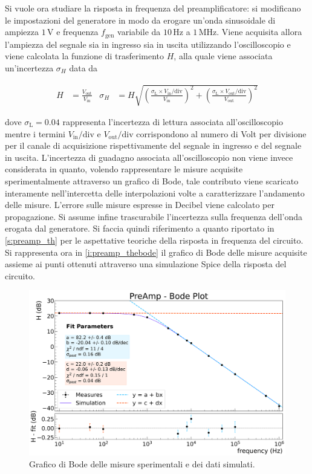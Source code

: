 \documentclass[a4paper,11pt]{article} %
\begin{document}
Si vuole ora studiare la risposta in frequenza del preamplificatore: si modificano le impostazioni del generatore in
modo da erogare un'onda sinusoidale di ampiezza $1\,\si{\volt}$ e frequenza $f_{\text{gen}}$ variabile da $10\,\si{\Hz}$
a $1\,\si{\MHz}$. Viene acquisita allora l'ampiezza del segnale sia in ingresso sia in uscita utilizzando
l'oscilloscopio e viene calcolata la funzione di trasferimento $H$, alla quale viene associata un'incertezza
$\sigma_{H}$ data da

\begin{align}\label{e:preamp_H_err}
	H&=\frac{V_{\text{out}}}{V_{\text{in}}} & 
	\sigma_{H}&= H \sqrt{	
						\left(	\frac{	\sigma_{\text{L}}\times V_{\text{in}}/\text{div}	}{	V_{\text{in}}	}	\right)^2	 + 
						\left(	\frac{	\sigma_{\text{L}}\times V_{\text{out}}/\text{div}	}{	V_{\text{out}}	}	\right)^2 }
\end{align}

dove $\sigma_{\text{L}}=0.04$ rappresenta l'incertezza di lettura associata all'oscilloscopio mentre i termini
$V_{\text{in}}/\text{div}$ e $V_{\text{out}}/\text{div}$ corrispondono al numero di Volt per divisione per il canale di
acquisizione rispettivamente del segnale in ingresso e del segnale in uscita. L'incertezza di guadagno associata
all'oscilloscopio non viene invece considerata in quanto, volendo rappresentare le misure acquisite sperimentalmente
attraverso un grafico di Bode, tale contributo viene scaricato interamente nell'intercetta delle interpolazioni volte a
caratterizzare l'andamento delle misure. L'errore sulle misure espresse in Decibel viene calcolato per propagazione. Si
assume infine trascurabile l'incertezza sulla frequenza dell'onda erogata dal generatore. Si faccia quindi riferimento a
quanto riportato in \autoref{s:preamp_th} per le aspettative teoriche della risposta in frequenza del circuito. Si
rappresenta ora in \autoref{i:preamp_thebode} il grafico di Bode delle misure acquisite assieme ai punti ottenuti
attraverso una simulazione Spice della risposta del circuito.

\begin{figure}[H]
	\centering
	\includegraphics[width=0.9\linewidth]{../Plots/PreAmp/bode_plot.png}
	\caption{\small Grafico di Bode delle misure sperimentali e dei dati simulati.}
	\label{i:preamp_thebode}
\end{figure}
\end{document}
